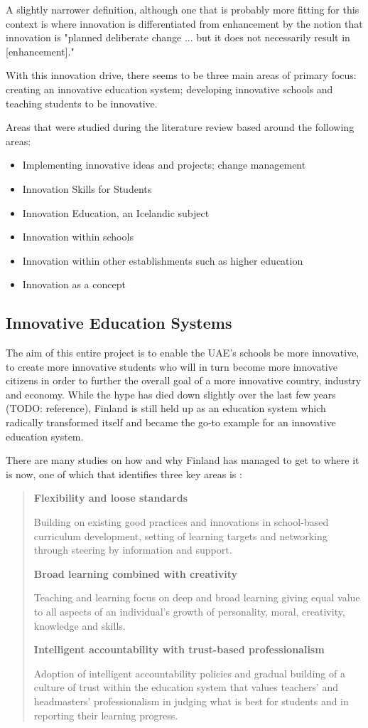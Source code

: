 A slightly narrower definition, although one that is probably more fitting for this context is where innovation is differentiated from enhancement by the notion that innovation is "planned deliberate change ... but it does not necessarily result in [enhancement]." \cite{hannan2002innovative}

With this innovation drive, there seems to be three main areas of primary focus: creating an innovative education system; developing innovative schools and teaching students to be innovative.

Areas that were studied during the literature review based around the following areas:
\begin{itemize}
\item Implementing innovative ideas and projects; change management
\item Innovation Skills for Students
\item Innovation Education, an Icelandic subject
\item Innovation within schools
\item Innovation within other establishments such as higher education
\item Innovation as a concept
\end{itemize}

\subsection{Innovative Education Systems}
The aim of this entire project is to enable the UAE's schools be more innovative, to create more innovative students who will in turn become more innovative citizens in order to further the overall goal of a more innovative country, industry and economy. While the hype has died down slightly over the last few years (TODO: reference), Finland is still held up as an education system which radically transformed itself and became the go-to example for an innovative education system.

There are many studies on how and why Finland has managed to get to where it is now, one of which that identifies three key areas is \citet{Sahlberg2007}:

\begin{quote}
\textbf{Flexibility and loose standards}

Building on existing good practices and innovations in school-based curriculum development, setting of learning targets and networking through steering by information and support.


\textbf{Broad learning combined with creativity}

Teaching and learning focus on deep and broad learning giving equal value to all aspects of an individual’s growth of personality, moral, creativity, knowledge and skills.


\textbf{Intelligent accountability with trust-based professionalism}

Adoption of intelligent accountability policies and gradual building of a culture of trust within the education system that values teachers’ and headmasters’ professionalism in judging what is best for students and in reporting their learning progress.
\end{quote}

